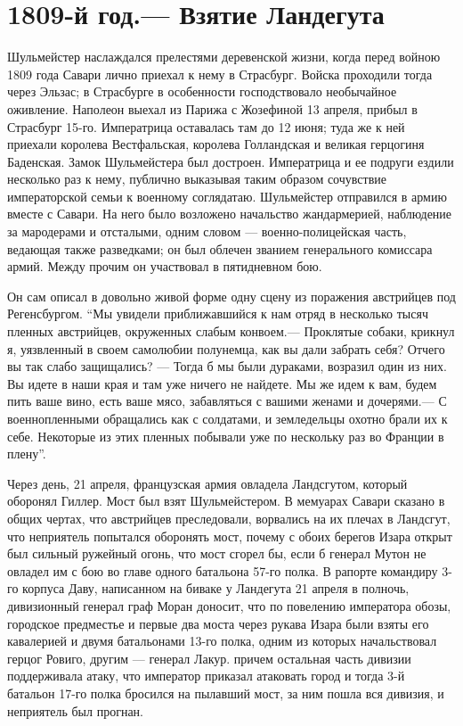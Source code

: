 \documentclass[
  oneside,
  12pt,
  titlepage]{book}
\begin{document}
\hypertarget{ux439-ux433ux43eux434.-ux432ux437ux44fux442ux438ux435-ux43bux430ux43dux434ux435ux433ux443ux442ux430}{%
\chapter{1809-й год.--- Взятие Ландегута}\label{ux439-ux433ux43eux434.-ux432ux437ux44fux442ux438ux435-ux43bux430ux43dux434ux435ux433ux443ux442ux430}}

Шульмейстер наслаждался прелестями деревенской жизни, когда перед войною 1809 года Савари лично приехал к нему в Страсбург. Войска проходили тогда через Эльзас; в Страсбурге в особенности господствовало необычайное оживление. Наполеон выехал из Парижа с Жозефиной 13 апреля, прибыл в Страсбург 15-го. Императрица оставалась там до 12 июня; туда же к ней приехали королева Вестфальская, королева Голландская и великая герцогиня Баденская. Замок Шульмейстера был достроен. Императрица и ее подруги ездили несколько раз к нему, публично выказывая таким образом сочувствие императорской семьи к военному соглядатаю. Шульмейстер отправился в армию вместе с Савари. На него было возложено начальство жандармерией, наблюдение за мародерами и отсталыми, одним словом --- военно-полицейская часть, ведающая также разведками; он был облечен званием генерального комиссара армий. Между прочим он участвовал в пятидневном бою.

Он сам описал в довольно живой форме одну сцену из поражения австрийцев под Регенсбургом. ``Мы увидели приближавшийся к нам отряд в несколько тысяч пленных австрийцев, окруженных слабым конвоем.--- Проклятые собаки, крикнул я, уязвленный в своем самолюбии полунемца, как вы дали забрать себя? Отчего вы так слабо защищались? --- Тогда б мы были дураками, возразил один из них. Вы идете в наши края и там уже ничего не найдете. Мы же идем к вам, будем пить ваше вино, есть ваше мясо, забавляться с вашими женами и дочерями.--- С военнопленными обращались как с солдатами, и земледельцы охотно брали их к себе. Некоторые из этих пленных побывали уже по нескольку раз во Франции в плену''.

Через день, 21 апреля, французская армия овладела Ландсгутом, который оборонял Гиллер. Мост был взят Шульмейстером. В мемуарах Савари сказано в общих чертах, что австрийцев преследовали, ворвались на их плечах в Ландсгут, что неприятель попытался оборонять мост, почему с обоих берегов Изара открыт был сильный ружейный огонь, что мост сгорел бы, если б генерал Мутон не овладел им с бою во главе одного батальона 57-го полка. В рапорте командиру 3-го корпуса Даву, написанном на биваке у Ландегута 21 апреля в полночь, дивизионный генерал граф Моран доносит, что по повелению императора обозы, городское предместье и первые два моста через рукава Изара были взяты его кавалерией и двумя батальонами 13-го полка, одним из которых начальствовал герцог Ровиго, другим --- генерал Лакур. причем остальная часть дивизии поддерживала атаку, что император приказал атаковать город и тогда 3-й батальон 17-го полка бросился на пылавший мост, за ним пошла вся дивизия, и неприятель был прогнан.
\end{document}
